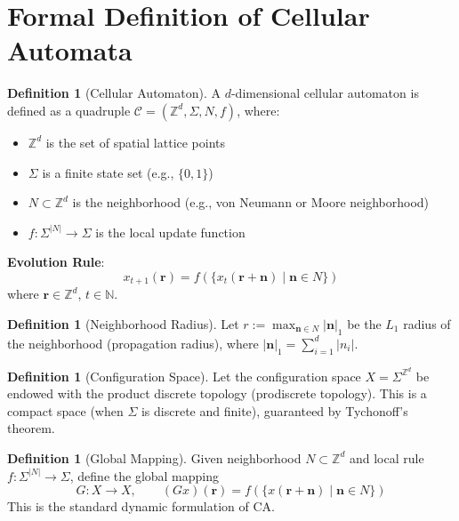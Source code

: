 \documentclass[11pt]{article}
\theoremstyle{definition}
\newtheorem{definition}[theorem]{Definition}
\theoremstyle{remark}
\begin{document}
\section{Formal Definition of Cellular Automata}\label{sec:formal}

\begin{definition}[Cellular Automaton]\label{def:ca}
A \( d \)-dimensional cellular automaton is defined as a quadruple \( \mathcal{C} = (\mathbb{Z}^d, \Sigma, N, f) \), where:
\begin{itemize}
\item \( \mathbb{Z}^d \) is the set of spatial lattice points
\item \( \Sigma \) is a finite state set (e.g., \( \{0,1\} \))
\item \( N \subset \mathbb{Z}^d \) is the neighborhood (e.g., von Neumann or Moore neighborhood)
\item \( f: \Sigma^{|N|} \to \Sigma \) is the local update function
\end{itemize}
\textbf{Evolution Rule}:
\[
x_{t+1}(\mathbf{r}) = f\left( \{ x_t(\mathbf{r} + \mathbf{n}) \mid \mathbf{n} \in N \} \right)
\]
where \( \mathbf{r} \in \mathbb{Z}^d \), \( t \in \mathbb{N} \).
\end{definition}

\begin{definition}[Neighborhood Radius]\label{def:radius}
Let \( r := \max_{\mathbf{n} \in N} |\mathbf{n}|_1 \) be the \( L_1 \) radius of the neighborhood (propagation radius), where \( |\mathbf{n}|_1 = \sum_{i=1}^d |n_i| \).
\end{definition}

\begin{definition}[Configuration Space]\label{def:config}
Let the configuration space \( X = \Sigma^{\mathbb{Z}^d} \) be endowed with the product discrete topology (prodiscrete topology). This is a compact space (when \( \Sigma \) is discrete and finite), guaranteed by Tychonoff's theorem.
\end{definition}

\begin{definition}[Global Mapping]\label{def:global}
Given neighborhood \( N \subset \mathbb{Z}^d \) and local rule \( f: \Sigma^{|N|} \to \Sigma \), define the global mapping
\[
G: X \to X, \qquad (G x)(\mathbf{r}) = f\left( \{ x(\mathbf{r} + \mathbf{n}) \mid \mathbf{n} \in N \} \right)
\]
This is the standard dynamic formulation of CA.
\end{definition}
\end{document}
